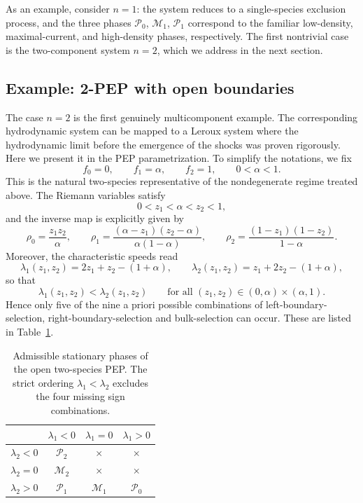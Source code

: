 \documentclass[12pt]{article}
\begin{document}
As an example, consider $n=1$: the system reduces to a single-species
exclusion process, and the three phases
$\mathcal{P}_0$, $\mathcal{M}_1$, $\mathcal{P}_1$
correspond to the familiar low-density, maximal-current, and high-density
phases, respectively. The first nontrivial case is the two-component
system $n=2$, which we address in the next section.


\subsection{Example: 2-PEP with open boundaries}

The case $n=2$ is the first genuinely multicomponent example. The
corresponding hydrodynamic system can be mapped to a Leroux system \cite{Toth03} 
where the hydrodynamic limit before the emergence of the shocks was proven rigorously. Here we present it in the PEP
parametrization.
To simplify the notations, we fix
\[
 f_0=0,\qquad f_1=\alpha,\qquad f_2=1,
 \qquad 0<\alpha<1.
\]
This is the natural two-species representative of the nondegenerate
regime treated above. The Riemann variables satisfy
\[
0<z_1<\alpha<z_2<1,
\]
and the inverse map is explicitly given by
\[
\rho_0=\frac{z_1z_2}{\alpha},\qquad
\rho_1=\frac{(\alpha-z_1)(z_2-\alpha)}{\alpha(1-\alpha)},\qquad
\rho_2=\frac{(1-z_1)(1-z_2)}{1-\alpha}.
\]
Moreover, the characteristic speeds read
\[
\lambda_1(z_1,z_2)=2z_1+z_2-(1+\alpha),
\qquad
\lambda_2(z_1,z_2)=z_1+2z_2-(1+\alpha),
\]
so that
\[
\lambda_1(z_1,z_2)<\lambda_2(z_1,z_2)
\qquad\text{for all }(z_1,z_2)\in(0,\alpha)\times(\alpha,1).
\]
Hence only five of the nine a priori possible combinations of
left-boundary-selection, right-boundary-selection and bulk-selection can
occur. These are listed in Table~\ref{tab:pep2-phases}.

\begin{table}[h!]
\centering
\begin{tabular}{c||c|c|c}
 & $\lambda_1<0$ & $\lambda_1=0$ & $\lambda_1>0$ \\\hline\hline
$\lambda_2<0$ & $\mathcal P_2$ & $\times$ & $\times$ \\\hline
$\lambda_2=0$ & $\mathcal M_2$ & $\times$ & $\times$ \\\hline
$\lambda_2>0$ & $\mathcal P_1$ & $\mathcal M_1$ & $\mathcal P_0$
\end{tabular}
\caption{Admissible stationary phases of the open two-species PEP. The
strict ordering $\lambda_1<\lambda_2$ excludes the four missing sign
combinations.}
\label{tab:pep2-phases}
\end{table}
\end{document}
